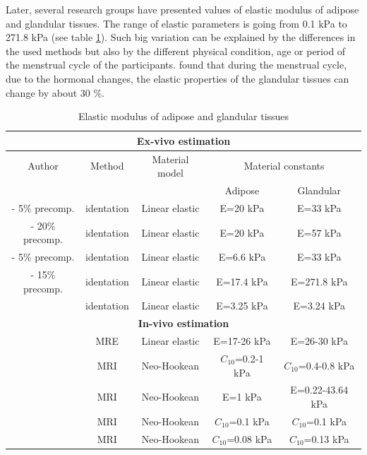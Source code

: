  Later, several research groups have presented values of elastic modulus of adipose and glandular tissues. The range of elastic parameters is going from 0.1 kPa to 271.8 kPa (see table \ref{elastic_modulus_table}). Such big variation can be explained by the differences in the used methods but also by the different physical condition, age or period of the menstrual cycle of the participants. \cite{lorenzen_menstrual-cycle_2003} found that during the menstrual cycle, due to the hormonal changes, the elastic properties of the glandular tissues can change by about 30 \%. 
\begin{table}
    \centering
   \begin{tabular}{c|c|c|c|c}
   \hline
  \multicolumn{5}{c}{\textbf{Ex-vivo estimation}}\\
   \hline
    Author & Method & Material model&\multicolumn{2}{c}{Material constants} \\
    \cline{4-5}
    &&& Adipose & Glandular\\
    \hline
    \cite{krouskop_elastic_1998} - 5\% precomp. & identation & Linear elastic & E=20 kPa & E=33 kPa \\
    \cite{krouskop_elastic_1998} - 20\% precomp. & identation & Linear elastic & E=20 kPa & E=57 kPa \\
    \cite{wellman_breast_1999}- 5\% precomp. & identation & Linear elastic & E=6.6 kPa & E=33 kPa \\
    \cite{wellman_breast_1999}- 15\% precomp. & identation & Linear elastic & E=17.4 kPa & E=271.8 kPa \\
     \cite{samani_elastic_2007} & identation & Linear elastic & E=3.25 kPa & E=3.24 kPa \\
   \hline
  \multicolumn{5}{c}{\textbf{In-vivo estimation}}\\
   \hline
     \cite{van_houten_initial_2003} & MRE & Linear elastic & E=17-26 kPa & E=26-30 kPa \\
     \cite{carter_determining_2009} & MRI & Neo-Hookean & $C_{10}$=0.2-1 kPa & $C_{10}$=0.4-0.8 kPa \\
     \cite{han_development_2012} & MRI & Neo-Hookean & E=1 kPa & E=0.22-43.64 kPa \\
     \cite{gamage_modelling_2012} & MRI & Neo-Hookean & $C_{10}$=0.1 kPa & $C_{10}$=0.1 kPa \\
     \cite{Rajagopal_creating_2008} & MRI & Neo-Hookean & $C_{10}$=0.08 kPa & $C_{10}$=0.13 kPa \\
    
    
    \end{tabular}
     \caption{Elastic modulus of adipose and glandular tissues}
     \label{elastic_modulus_table}
\end{table}

